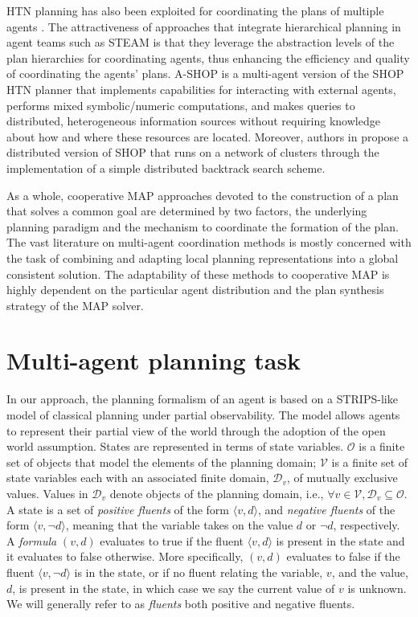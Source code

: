 \documentclass[12pt]{article}
\begin{document}
HTN planning has also been exploited for coordinating the plans of multiple agents \cite{Clement1999TheoryFC}. The attractiveness of approaches that integrate hierarchical planning in agent teams such as STEAM \cite{Tambe1997TowardsFT} is that they leverage the abstraction levels of the plan hierarchies for coordinating agents, thus enhancing the efficiency and quality of coordinating the agents’ plans. A-SHOP \cite{Dix2003IMPACTingSP} is a multi-agent version of the SHOP HTN planner \cite{Nau_2003} that implements capabilities for interacting with external agents, performs mixed symbolic/numeric computations, and makes queries to distributed, heterogeneous information sources without requiring knowledge about how and where these resources are located. Moreover, authors in \cite{Kabanza2005DISTRIBUTEDHT} propose a distributed version of SHOP that runs on a network of clusters through the implementation of a simple distributed backtrack search scheme.

As a whole, cooperative MAP approaches devoted to the construction of a plan that solves a common goal are determined by two factors, the underlying planning paradigm and the mechanism to coordinate the formation of the plan. The vast literature on multi-agent coordination methods is mostly concerned with the task of combining and adapting local planning representations into a global consistent solution. The adaptability of these methods to cooperative MAP is highly dependent on the particular agent distribution and the plan synthesis strategy of the MAP solver.

\section{Multi-agent planning task}

In our approach, the planning formalism of an agent is based on a STRIPS-like model of classical planning under partial observability. The model allows agents to represent their partial view of the world through the adoption of the open world assumption. States are represented in terms of state variables. $\mathcal{O}$ is a finite set of objects that model the elements of the planning domain; $\mathcal{V}$ is a finite set of state variables each with an associated finite domain, $\mathcal{D}_v$, of mutually exclusive values. Values in $\mathcal{D}_v$ denote objects of the planning domain, i.e., $\forall v \in \mathcal{V}, \mathcal{D}_v \subseteq \mathcal{O}$. A state is a set of \textit{positive fluents} of the form $\langle v,d\rangle$, and \textit{negative fluents} of the form $\langle v,\neg d\rangle$, meaning that the variable takes on the value $d$ or $\neg d$, respectively. A \textit{formula} $(v, d)$ evaluates to true if the fluent $\langle v,d\rangle$ is present in the state and it evaluates to false otherwise. More specifically, $(v, d)$ evaluates to false if the fluent $\langle v,\neg d\rangle$ is in the state, or if no fluent relating the variable, $v$, and the value, $d$, is present in the state, in which case we say the current value of $v$ is unknown. We will generally refer to as \textit{fluents} both positive and negative fluents.
\end{document}
